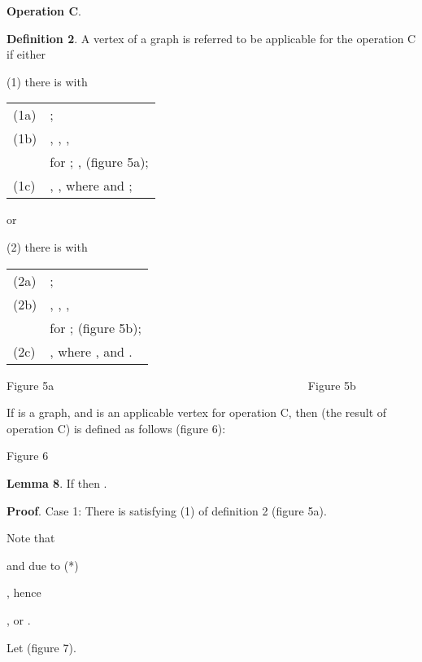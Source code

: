 \documentclass{article}
\begin{document}
\bigskip

\textbf{Operation C}.

\textbf{Definition 2}. A vertex  of a graph  is referred to be
applicable for the operation C if either

(1) there is  with

\qquad 
\begin{tabular}{ll}
(1a) & ; \\ 
(1b) & , , , \\ 
&  for ; ,  (figure 5a); \\ 
(1c) & , , where  and ;\end{tabular}

or

(2) there is  with

\qquad 
\begin{tabular}{ll}
(2a) & ; \\ 
(2b) & , , , \\ 
&  for ;  (figure
5b); \\ 
(2c) & , where , and .\end{tabular}

\begin{center}

Figure 5a \ \ \ \ \ \ \ \ \ \ \ \ \ \ \ \ \ \ \ \ \ \ \ \ \ \ \ \ \ \ \ \ \
\ \ \ \ \ \ \ \ \ \ \ Figure 5b\bigskip
\end{center}

If  is a graph, and  is an applicable vertex for operation C, then  (the result of operation C) is defined as follows (figure 6):

\begin{center}

Figure 6\bigskip
\end{center}

\textbf{Lemma 8}. If  then .

\textbf{Proof}. Case 1: There is 
satisfying (1) of definition 2 (figure 5a).

Note that

\begin{center}
 and due to (*)

 , hence

, or .
\end{center}

Let  (figure 7).
\end{document}
